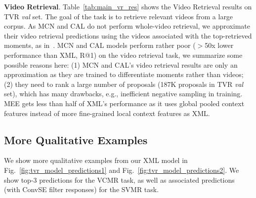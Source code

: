 \documentclass[runningheads]{llncs}
\begin{document}
\kern2mm
\noindent\textbf{Video Retrieval}.
Table~\ref{tab:main_vr_res} shows the Video Retrieval results on TVR \textit{val} set. The goal of the task is to retrieve relevant videos from a large corpus.
As MCN and CAL do not perform whole-video retrieval, we approximate their video retrieval predictions using the videos associated with the top-retrieved moments, as in~\cite{escorcia2019temporal}.
MCN and CAL models perform rather poor ($>$50x lower performance than XML, R@1) on the video retrieval task, we summarize some possible reasons here: (1) MCN and CAL's video retrieval results are only an approximation as they are trained to differentiate moments rather than videos; (2) they need to rank a large number of proposals (187K proposals in TVR \textit{val} set), which has many drawbacks, e.g., inefficient negative sampling in training.
MEE gets less than half of XML's performance as it uses global pooled context features instead of more fine-grained local context features as XML.


\subsection{More Qualitative Examples}
We show more qualitative examples from our XML model in Fig.~\ref{fig:tvr_model_predictions1} and Fig.~\ref{fig:tvr_model_predictions2}. We show top-3 predictions for the VCMR task, as well as associated predictions (with ConvSE filter responses) for the SVMR task.
\end{document}
